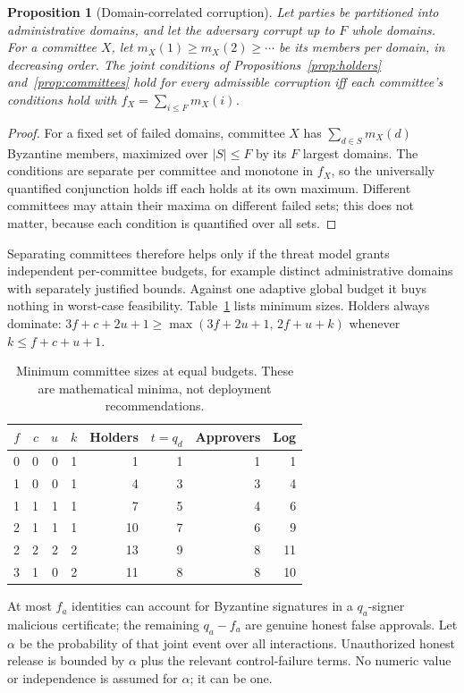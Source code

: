 \documentclass[pdflatex,sn-mathphys-num]{sn-jnl}
\theoremstyle{plain}
\newtheorem{proposition}[theorem]{Proposition}
\theoremstyle{definition}
\begin{document}
\begin{proposition}[Domain-correlated corruption]\label{prop:domains}
Let parties be partitioned into administrative domains, and let the adversary corrupt up to $F$ whole domains. For a committee $X$, let $m_X(1)\ge m_X(2)\ge\cdots$ be its members per domain, in decreasing order. The joint conditions of Propositions~\ref{prop:holders} and~\ref{prop:committees} hold for every admissible corruption iff each committee's conditions hold with $f_X=\sum_{i\le F}m_X(i)$.
\end{proposition}
\begin{proof}
For a fixed set of failed domains, committee $X$ has $\sum_{d\in S}m_X(d)$ Byzantine members, maximized over $|S|\le F$ by its $F$ largest domains. The conditions are separate per committee and monotone in $f_X$, so the universally quantified conjunction holds iff each holds at its own maximum. Different committees may attain their maxima on different failed sets; this does not matter, because each condition is quantified over all sets.
\end{proof}

Separating committees therefore helps only if the threat model grants independent per-committee budgets, for example distinct administrative domains with separately justified bounds. Against one adaptive global budget it buys nothing in worst-case feasibility. Table~\ref{tab:sensitivity} lists minimum sizes. Holders always dominate: $3f+c+2u+1\ge\max(3f+2u+1,\,2f+u+k)$ whenever $k\le f+c+u+1$.

\begin{table}[htbp]
\caption{Minimum committee sizes at equal budgets. These are mathematical minima, not deployment recommendations.}\label{tab:sensitivity}
\centering\small
\begin{tabular}{@{}rrrrrrrr@{}}\toprule
$f$&$c$&$u$&$k$&Holders&$t=q_d$&Approvers&Log\\\midrule
0&0&0&1&1&1&1&1\\
1&0&0&1&4&3&3&4\\
1&1&1&1&7&5&4&6\\
2&1&1&1&10&7&6&9\\
2&2&2&2&13&9&8&11\\
3&1&0&2&11&8&8&10\\\bottomrule
\end{tabular}
\end{table}

At most $f_a$ identities can account for Byzantine signatures in a $q_a$-signer malicious certificate; the remaining $q_a-f_a$ are genuine honest false approvals. Let $\alpha$ be the probability of that joint event over all interactions. Unauthorized honest release is bounded by $\alpha$ plus the relevant control-failure terms. No numeric value or independence is assumed for $\alpha$; it can be one.
\end{document}
